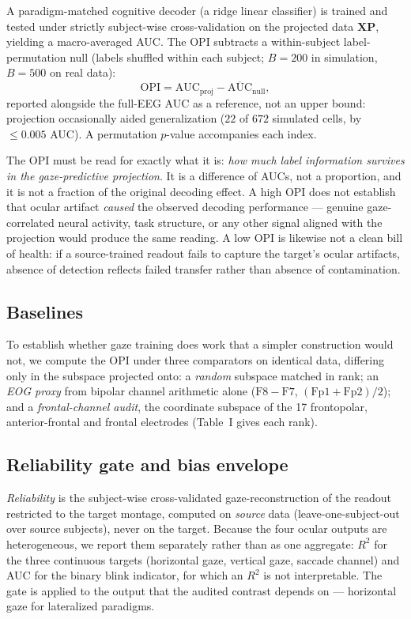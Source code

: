 \documentclass[conference]{IEEEtran}
\begin{document}
A paradigm-matched cognitive decoder (a ridge linear classifier) is trained and tested under
strictly subject-wise cross-validation on the projected data $\mathbf{X}\mathbf{P}$, yielding a
macro-averaged AUC. The OPI subtracts a within-subject label-permutation null (labels shuffled
within each subject; $B=200$ in simulation, $B=500$ on real data):
\begin{equation}
\mathrm{OPI}=\mathrm{AUC}_{\mathrm{proj}}-\overline{\mathrm{AUC}}_{\mathrm{null}},
\end{equation}
reported alongside the full-EEG AUC as a reference, not an upper bound: projection occasionally
aided generalization ($22$ of $672$ simulated cells, by ${\le}0.005$ AUC). A permutation
$p$-value accompanies each index.

The OPI must be read for exactly what it is: \emph{how much label information survives in the
gaze-predictive projection}. It is a difference of AUCs, not a proportion, and it is not a
fraction of the original decoding effect. A high OPI does not establish that ocular artifact
\emph{caused} the observed decoding performance --- genuine gaze-correlated neural activity,
task structure, or any other signal aligned with the projection would produce the same reading.
A low OPI is likewise not a clean bill of health: if a source-trained readout fails to capture
the target's ocular artifacts, absence of detection reflects failed transfer rather than absence
of contamination.

\subsection{Baselines}

To establish whether gaze training does work that a simpler construction would not, we compute
the OPI under three comparators on identical data, differing only in the subspace projected onto: a
\emph{random} subspace matched in rank; an \emph{EOG proxy} from bipolar channel arithmetic alone
($\mathrm{F8}-\mathrm{F7}$, $(\mathrm{Fp1}+\mathrm{Fp2})/2$); and a \emph{frontal-channel audit}, the
coordinate subspace of the 17 frontopolar, anterior-frontal and frontal electrodes (Table~I gives
each rank).

\subsection{Reliability gate and bias envelope}

\emph{Reliability} is the subject-wise cross-validated gaze-reconstruction of the readout
restricted to the target montage, computed on \emph{source} data (leave-one-subject-out over
source subjects), never on the target. Because the four ocular outputs are heterogeneous, we
report them separately rather than as one aggregate: $R^2$ for the three continuous targets
(horizontal gaze, vertical gaze, saccade channel) and AUC for the binary blink indicator, for
which an $R^2$ is not interpretable. The gate is applied to the output that the audited contrast
depends on --- horizontal gaze for lateralized paradigms.
\end{document}
